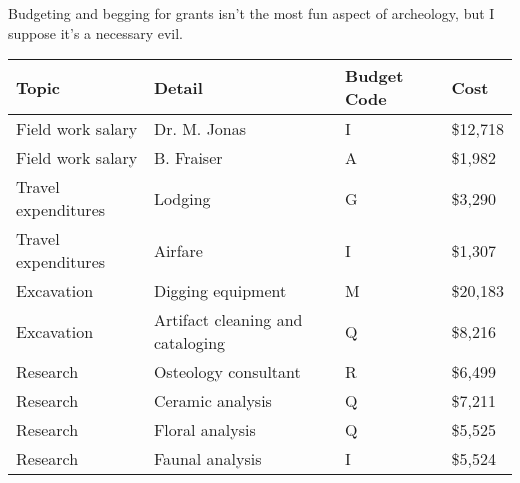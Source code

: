 {\LARGE\normalfont\wedn
Budgeting and begging for grants isn't the most fun aspect of
archeology, but I suppose it's a necessary evil.

\normalsize
\begin{center}
\begin{tabular}{llll}
\textbf{Topic}      & \textbf{Detail}                  & \textbf{Budget Code} & \textbf{Cost}     \\\hline
Field work salary   & Dr. M. Jonas                     & I           & \$12,718 \\
Field work salary   & B. Fraiser                       & A           & \$1,982  \\
Travel expenditures & Lodging                          & G           & \$3,290  \\
Travel expenditures & Airfare                          & I           & \$1,307  \\
Excavation          & Digging equipment                & M           & \$20,183 \\
Excavation          & Artifact cleaning and cataloging & Q           & \$8,216  \\
Research            & Osteology consultant             & R           & \$6,499  \\
Research            & Ceramic analysis                 & Q           & \$7,211  \\
Research            & Floral analysis                  & Q           & \$5,525  \\
Research            & Faunal analysis                  & I           & \$5,524 
\end{tabular}
\end{center}
}
